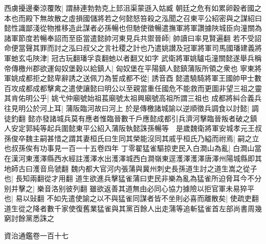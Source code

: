 西虜擾邊秦涼覆敗|{
	謂赫連勃勃克上邽沮渠蒙遜入姑臧}
朝廷之危有如累卵穀者國之本也而殿下無故散之虛損國儲將若之何懿怒笞殺之泓聞之召東平公紹密與之謀紹曰懿性識鄙淺從物推移造此謀者必孫暢也但馳使徵暢遣撫軍將軍讚據陜城臣向潼關為諸軍節度若暢奉詔而至臣當遣懿帥河東見兵共禦晉師|{
	帥讀曰率見賢遍翻}
若不受詔命便當聲其罪而討之泓曰叔父之言社稷之計也乃遣姚讃及冠軍將軍司馬國璠建義將軍虵玄屯陜津|{
	冠古玩翻璠孚袁翻虵以者翻又如字}
武衛將軍姚驢屯潼關懿遂舉兵稱帝傳檄州郡欲運匈奴堡穀以給鎮人|{
	匈奴堡在平陽鎮人懿鎮蒲阪所領之衆也}
寧東將軍姚成都拒之懿卑辭誘之送佩刀為誓成都不從|{
	誘音酉}
懿遣驍騎將軍王國帥甲士數百攻成都成都擊禽之遣使讓懿曰明公以至親當重任國危不能救而更圖非望三祖之靈其肯佑明公乎|{
	姚弋仲廟號始祖萇廟號太祖興廟號高祖所謂三祖也}
成都將糾合義兵往見明公於河上耳|{
	蒲阪臨河故曰河上}
於是傳檄諸城諭以逆順徵兵調食以討懿|{
	調徒釣翻}
懿亦發諸城兵莫有應者惟臨晉數千戶應懿成都引兵濟河擊臨晉叛者破之鎮人安定郭純等起兵圍懿東平公紹入蒲阪執懿誅孫暢等　是歲魏衛將軍安城孝元王叔孫俊卒魏主嗣甚惜之謂其妻桓氏曰生同其榮能沒同其戚乎桓氏乃縊而祔焉|{
	嗣之立也叔孫俟有功事見一百一十五卷四年}
丁零翟猛雀驅掠吏民入白澗山為亂|{
	白澗山當在漢河東濩澤縣西水經註濩澤水出濩澤城西白澗嶺東逕濩澤濩澤唐澤州陽城縣即其地師古曰濩音烏虢翻}
魏内都大官河内張蒲與冀州刺史長孫道生討之道生嵩之從子也|{
	長知兩翻從才用翻}
道生欲進兵擊猛雀蒲曰吏民非樂為亂為猛雀所迫脅耳今不分别并擊之|{
	樂音洛别彼列翻}
雖欲返善其道無由必同心協力據險以拒官軍未易猝平也|{
	易以䜴翻}
不如先遣使諭之以不與猛雀同謀者皆不坐則必喜而離散矣|{
	使疏吏翻}
道生從之降者數千家使復舊業猛雀與其黨百餘人出走蒲等追斬猛雀首左部尚書周幾窮討餘黨悉誅之

資治通鑑卷一百十七
